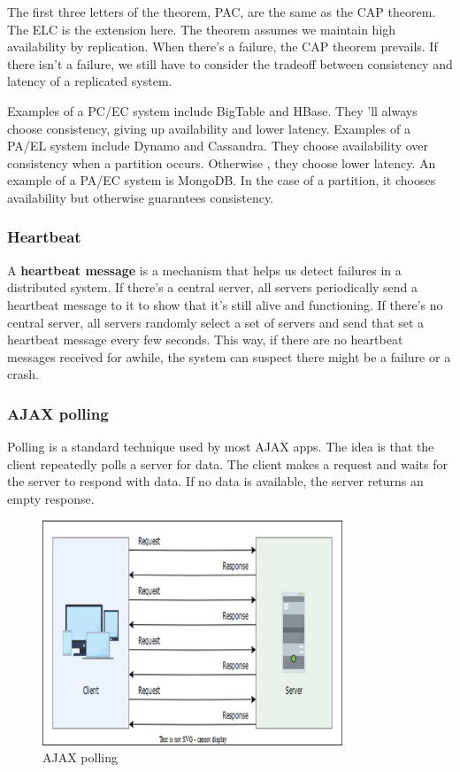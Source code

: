 The first three letters of the theorem, PAC, are the same as the CAP theorem. The ELC is the extension here. The theorem assumes we maintain high availability by replication. When there's a failure, the CAP theorem prevails. If there isn't a failure, we still have to consider the tradeoff between consistency and latency of a replicated system.

Examples of a PC/EC system include BigTable and HBase. They 'll always choose consistency, giving up availability and lower latency. Examples of a PA/EL system include Dynamo and Cassandra. They choose availability over consistency when a partition occurs. Otherwise
, they choose lower latency. An example of a PA/EC system is MongoDB. In the case of a partition, it chooses availability but otherwise guarantees consistency.

\subsubsection{Heartbeat}\label{jsbU1NcYO3HigIlOhro6_}

A \textbf{heartbeat message} is a mechanism that helps us detect failures in a distributed system. If there's a central server, all servers periodically send a heartbeat message to it to show that it's still alive and functioning. If there's no central server, all servers randomly select a set of servers and send that set a heartbeat message every few seconds. This way, if there are no heartbeat messages received for awhile, the system can suspect there might be a failure or a crash.

\subsubsection{AJAX polling}\label{enUJIr-lZgGNXvH3Wjdd0}

Polling is a standard technique used by most AJAX apps. The idea is that the client repeatedly polls a server for data. The client makes a request and waits for the server to respond with data. If no data is available, the server returns an empty response.

\begin{figure}[htbp]
 \centering
 \includegraphics[width=0.8\textwidth]{Images/chapter_1/section_4705505809661952/4686911117852672.png}
 \caption{AJAX polling}
\end{figure}

